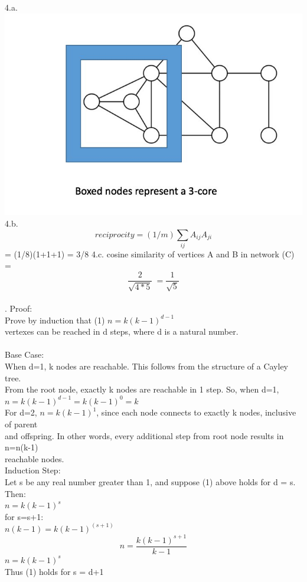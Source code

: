 \documentclass[11pt, oneside]{article}   	%
\begin{document}
\bigskip
\bigskip
\justify
4.a.\\
\includegraphics{3core}\\
\vskip 1in
\justify
4.b. $$reciprocity = (1/m)\sum_{ij} A_{ij} A_{ji}$$
\center = (1/8)(1+1+1) = 3/8
\justify
4.c.  cosine similarity of vertices A and B in network (C) = \[ \frac{2}{\sqrt{4*5}}\  = \frac{1}{\sqrt{5}} \]\\
. Proof: \\
\indent
Prove by induction that
\center(1) $n=k(k-1)^{d-1}$\\
\justify
\indent
\indent
vertexes can be reached in d steps, where d is a natural number.\\
\\
Base Case:\\
\indent When d=1, k nodes are reachable.  This follows from the structure of a Cayley tree.\\
\indent From the root node, exactly k nodes are reachable in 1 step.  So, when d=1,\\
\center $n=k(k-1)^{d-1} = k(k-1)^{0} = k$\\
\justify
\indent
\indent For d=2, $n=k(k-1)^1$, since each node connects to exactly k nodes, inclusive of parent\\
\indent and offspring.  In other words, every additional step from root node results in n=n(k-1)\\
\indent reachable nodes.\\
Induction Step:\\
\indent Let s be any real number greater than 1, and suppose (1) above holds for d = s. Then:\\
\center $n=k(k-1)^{s}$\\
\justify
\indent for s=s+1:\\
\center $n(k-1) = k(k-1)^{(s+1)}$\\
\[ n = \frac{k(k-1)^{s+1}}{k-1}\]
$n = k(k-1)^s$\\
\justify
\indent Thus (1) holds for s = d+1\\
\end{document}
